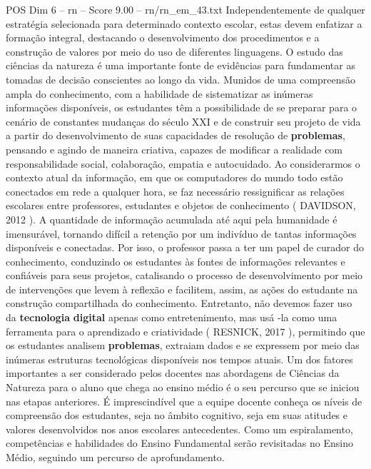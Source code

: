 \begin{textsample}{POS Dim 6 – rn – Score 9.00 – rn/rn\_em\_43.txt}  \label{ex:f6_pos_232}
Independentemente de qualquer estratégia selecionada para determinado contexto escolar, estas devem enfatizar a formação integral, destacando o desenvolvimento dos procedimentos e a construção de valores por meio do uso de diferentes linguagens.
O estudo das ciências da natureza é uma importante fonte de evidências para fundamentar as tomadas de decisão conscientes ao longo da vida.
Munidos de uma compreensão ampla do conhecimento, com a habilidade de sistematizar as inúmeras informações disponíveis, os estudantes têm a possibilidade de se preparar para o cenário de constantes mudanças do século XXI e de construir seu projeto de vida a partir do desenvolvimento de suas capacidades de resolução de \textbf{problemas}, pensando e agindo de maneira criativa, capazes de modificar a realidade com responsabilidade social, colaboração, empatia e autocuidado.
Ao considerarmos o contexto atual da informação, em que os computadores do mundo todo estão conectados em rede a qualquer hora, se faz necessário ressignificar as relações escolares entre professores, estudantes e objetos de conhecimento ( DAVIDSON, 2012 ).
A quantidade de informação acumulada até aqui pela humanidade é imensurável, tornando difícil a retenção por um indivíduo de tantas informações disponíveis e conectadas.
Por isso, o professor passa a ter um papel de curador do conhecimento, conduzindo os estudantes às fontes de informações relevantes e confiáveis para seus projetos, catalisando o processo de desenvolvimento por meio de intervenções que levem à reflexão e facilitem, assim, as ações do estudante na construção compartilhada do conhecimento.
Entretanto, não devemos fazer uso da \textbf{tecnologia} \textbf{digital} apenas como entretenimento, mas usá -la como uma ferramenta para o aprendizado e criatividade ( RESNICK, 2017 ), permitindo que os estudantes analisem \textbf{problemas}, extraiam dados e se expressem por meio das inúmeras estruturas tecnológicas disponíveis nos tempos atuais.
Um dos fatores importantes a ser considerado pelos docentes nas abordagens de Ciências da Natureza para o aluno que chega ao ensino médio é o seu percurso que se iniciou nas etapas anteriores.
É imprescindível que a equipe docente conheça os níveis de compreensão dos estudantes, seja no âmbito cognitivo, seja em suas atitudes e valores desenvolvidos nos anos escolares antecedentes.
Como um espiralamento, competências e habilidades do Ensino Fundamental serão revisitadas no Ensino Médio, seguindo um percurso de aprofundamento.

\end{textsample}
